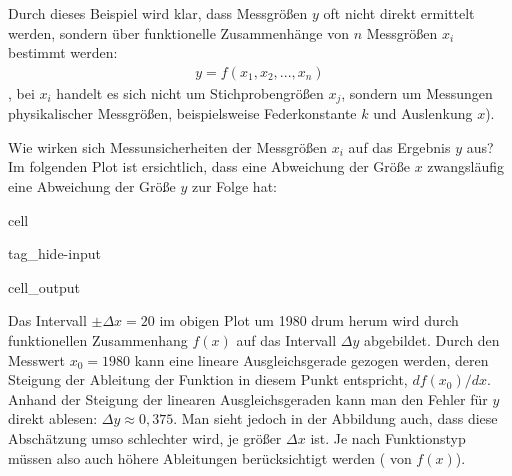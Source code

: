 \documentclass[letterpaper,10pt,english]{jupyterBook}
\begin{document}
\sphinxAtStartPar
{}

\sphinxAtStartPar
Durch dieses Beispiel wird klar, dass Messgrößen \(y\) oft nicht direkt ermittelt werden, sondern über funktionelle Zusammenhänge von \(n\) Messgrößen \(x_i\) bestimmt werden:
\begin{equation*}
\begin{split} y = f(x_1, x_2, ...,x_n)\end{split}
\end{equation*}
\sphinxAtStartPar
{}, bei \(x_i\) handelt es sich nicht um Stichprobengrößen \(x_j\), sondern um  Messungen  physikalischer Messgrößen, beispielsweise Federkonstante \(k\) und Auslenkung \(x\)).

\sphinxAtStartPar
Wie wirken sich Messunsicherheiten der Messgrößen \(x_i\) auf das Ergebnis \(y\) aus? Im folgenden Plot ist ersichtlich, dass eine Abweichung der Größe \(x\) zwangsläufig eine Abweichung der Größe \(y\) zur Folge hat:

\begin{sphinxuseclass}{cell}
\begin{sphinxuseclass}{tag_hide-input}\begin{sphinxVerbatimOutput}

\begin{sphinxuseclass}{cell_output}
\noindent{}

\end{sphinxuseclass}\end{sphinxVerbatimOutput}

\end{sphinxuseclass}
\end{sphinxuseclass}
\sphinxAtStartPar
Das Intervall \(\pm \Delta x = 20\) im obigen Plot um 1980 drum herum wird durch  funktionellen Zusammenhang \(f(x)\) auf das Intervall \(\Delta y\) abgebildet. Durch den Messwert \(x_0 = 1980\) kann eine lineare Ausgleichsgerade gezogen werden, deren Steigung der Ableitung der Funktion in diesem Punkt entspricht, \(df(x_0)/dx\). Anhand der Steigung der linearen Ausgleichsgeraden kann man den Fehler für \(y\) direkt ablesen: \(\Delta y \approx 0,375\). Man sieht jedoch in der Abbildung auch, dass diese Abschätzung umso schlechter wird, je größer \(\Delta x\) ist. Je nach Funktionstyp müssen also auch höhere Ableitungen berücksichtigt werden ( von \(f(x)\)).
\end{document}

